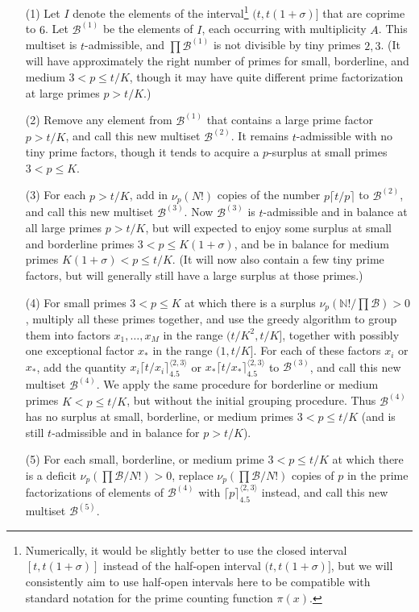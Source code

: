 \documentclass[12pt,a4paper,reqno]{amsart}
\numberwithin{equation}{section}
\theoremstyle{plain}
\theoremstyle{definition}
\newcommand\N{\mathbb{N}}
\newcommand\tuple{{\mathcal B}}
\begin{document}
\begin{enumerate}
\item[(1)] Let $I$ denote the elements of the interval\footnote{Numerically, it would be slightly better to use the closed interval $[t,t(1+\sigma)]$ instead of the half-open interval $(t,t(1+\sigma)]$, but we will consistently aim to use half-open intervals here to be compatible with standard notation for the prime counting function $\pi(x)$.} $(t,t(1+\sigma)]$ that are coprime to $6$.  Let $\tuple^{(1)}$ be the elements of $I$, each occurring with multiplicity $A$.  This multiset is $t$-admissible, and $\prod \tuple^{(1)}$ is not divisible by tiny primes $2,3$.  (It will have approximately the right number of primes for small, borderline, and medium $3 < p \leq t/K$, though it may have quite different prime factorization at large primes $p>t/K$.)
\item[(2)] Remove any element from $\tuple^{(1)}$ that contains a large prime factor $p > t/K$, and call this new multiset $\tuple^{(2)}$.  It remains $t$-admissible with no tiny prime factors, though it tends to acquire a $p$-surplus at small primes $3 < p \leq K$.
\item[(3)] For each $p > t/K$, add in $\nu_p(N!)$ copies of the number $p \lceil t/p \rceil$ to $\tuple^{(2)}$, and call this new multiset $\tuple^{(3)}$.   Now $\tuple^{(3)}$ is $t$-admissible and in balance at all large primes $p>t/K$, but will expected to enjoy some surplus at small and borderline primes $3 < p \leq K(1+\sigma)$, and be in balance for medium primes $K(1+\sigma) < p \leq t/K$.  (It will now also contain a few tiny prime factors, but will generally still have a large surplus at those primes.)
\item [(4)] For small primes $3 < p \leq K$ at which there is a surplus $\nu_p(\N!/\prod \tuple) > 0$, multiply all these primes together, and use the greedy algorithm to group them into factors $x_1, \dots, x_M$ in the range
$(t/K^2, t/K]$, together with possibly one exceptional factor $x_*$ in the range $(1, t/K]$.  For each of these factors $x_i$ or $x_*$, add the quantity $x_i \lceil t/x_i \rceil^{\langle 2,3 \rangle}_{4.5}$ or $x_* \lceil t/x_* \rceil^{\langle 2,3 \rangle}_{4.5}$ to $\tuple^{(3)}$, and call this new multiset $\tuple^{(4)}$.  We apply the same procedure for borderline or medium primes $K < p \leq t/K$, but without the initial grouping procedure. Thus $\tuple^{(4)}$ has no surplus at small, borderline, or medium primes $3 < p \leq t/K$ (and is still $t$-admissible and in balance for $p>t/K$).
\item[(5)] For each small, borderline, or medium prime $3 < p \leq t/K$ at which there is a deficit $\nu_p(\prod \tuple/N!) > 0$, replace $\nu_p(\prod \tuple/N!)$ copies of $p$ in the prime factorizations of elements of $\tuple^{(4)}$ with $\lceil p \rceil^{\langle 2,3 \rangle}_{4.5}$ instead, and call this new multiset $\tuple^{(5)}$.  

\end{enumerate}
\end{document}
